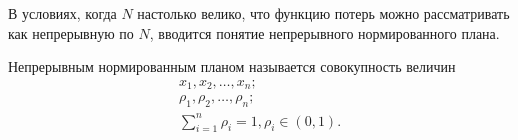 В условиях, когда  $N$ настолько велико, что функцию потерь можно рассматривать как непрерывную по $N$, вводится понятие непрерывного нормированного плана.
\begin{definition}
	Непрерывным нормированным планом называется совокупность величин
	\begin{gather}
	x_1, x_2, \dots, x_n;\\
	\rho_1, \rho_2, \dots, \rho_n;\\
	\sum_{i = 1}^n \rho_i = 1, \rho_i \in (0, 1).
	\end{gather}
\end{definition}
